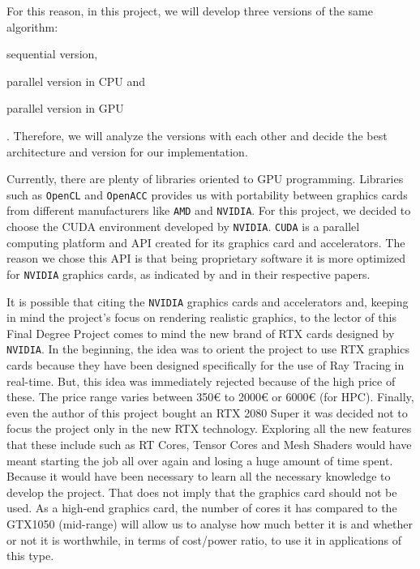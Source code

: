 \documentclass[titlepage,12pt]{article}
\begin{document}
For this reason, in this project, we will develop three versions of the same algorithm: \begin{enumerate*}[label=\roman*)] \item sequential version, \item parallel version in CPU and \item parallel version in GPU \end{enumerate*}. Therefore, we will analyze the versions with each other and decide the best architecture and version for our implementation.

Currently, there are plenty of libraries oriented to GPU programming. Libraries such as \texttt{OpenCL} and \texttt{OpenACC} provides us with portability between graphics cards from different manufacturers like \texttt{AMD} and \texttt{NVIDIA}. For this project, we decided to choose the CUDA environment developed by \texttt{NVIDIA}. \texttt{CUDA} is a parallel computing platform and API created for its graphics card and accelerators. The reason we chose this API is that being proprietary software it is more optimized for \texttt{NVIDIA} graphics cards, as indicated by \citep{Karimi2010} and \citep{Fang2011} in their respective papers.

It is possible that citing the \texttt{NVIDIA} graphics cards and accelerators and, keeping in mind the project's focus on rendering realistic graphics, to the lector of this Final Degree Project comes to mind the new brand of RTX cards designed by \texttt{NVIDIA}. In the beginning, the idea was to orient the project to use RTX graphics cards because they have been designed specifically for the use of Ray Tracing in real-time. But, this idea was immediately rejected because of the high price of these. The price range varies between 350€ to 2000€ or 6000€ (for HPC). Finally, even the author of this project bought an RTX 2080 Super it was decided not to focus the project only in the new RTX technology. Exploring all the new features that these include such as RT Cores, Tensor Cores and Mesh Shaders would have meant starting the job all over again and losing a huge amount of time spent. Because it would have been necessary to learn all the necessary knowledge to develop the project. That does not imply that the graphics card should not be used. As a high-end graphics card, the number of cores it has compared to the GTX1050 (mid-range) will allow us to analyse how much better it is and whether or not it is worthwhile, in terms of cost/power ratio, to use it in applications of this type.
\end{document}
